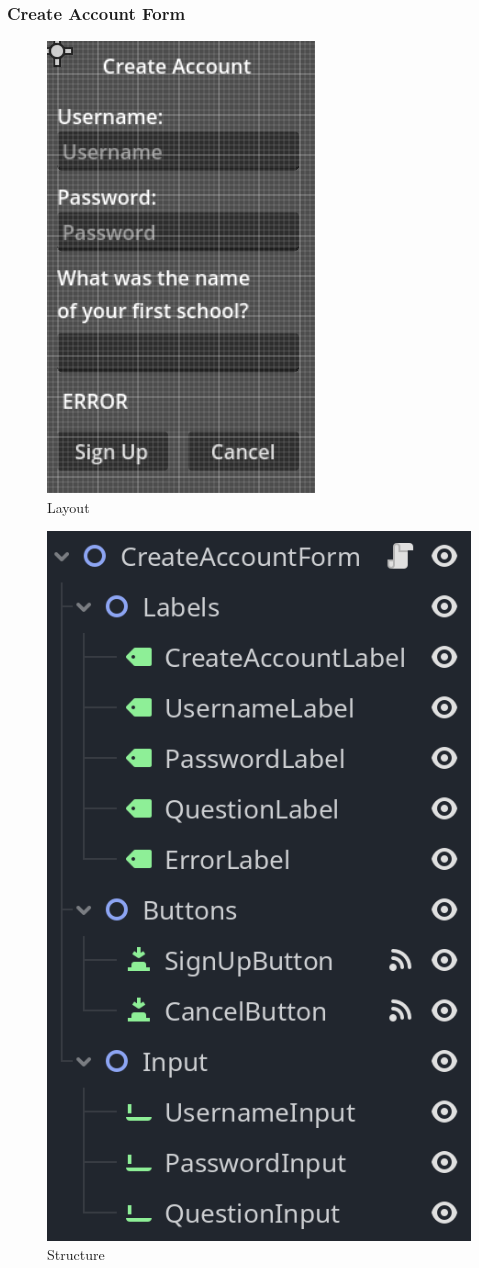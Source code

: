 \documentclass{article}
\begin{document}
        \subsubsection{Create Account Form}
        \begin{multicols}{2}
                \begin{figure}[H]
                        \centering
                        \includegraphics[width = 0.5\columnwidth]{images/development/CreateAccountForm_layout.PNG}
                        \caption{Layout}
                \end{figure}
                \begin{figure}[H]
                        \centering
                        \includegraphics[width = 0.6\columnwidth]{images/development/CreateAccountForm_structure.PNG}
                        \caption{Structure}
                \end{figure}
        \end{multicols}
\end{document}
